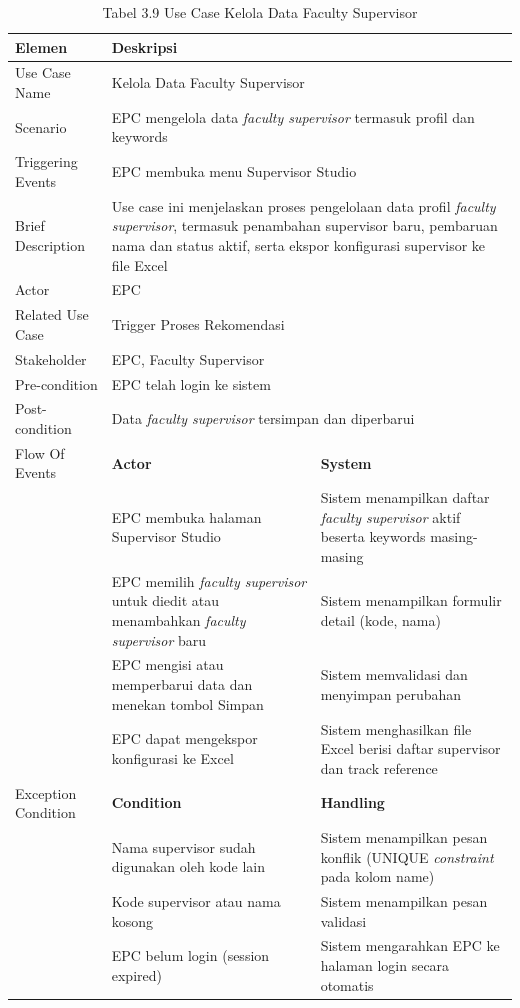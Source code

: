 \begin{longtable}{|p{3.5cm}|p{4.5cm}|p{5cm}|}
\caption{Tabel 3.9 Use Case Kelola Data Faculty Supervisor} \label{table:tab3.9} \\
\hline
\textbf{Elemen} & \multicolumn{2}{p{\ucdeskcol}|}{\textbf{Deskripsi}} \\
\hline
\endfirsthead
\endhead
\hline
\endfoot
Use Case Name & \multicolumn{2}{p{\ucdeskcol}|}{Kelola Data Faculty Supervisor} \\
\hline
Scenario & \multicolumn{2}{p{\ucdeskcol}|}{EPC mengelola data \textit{faculty supervisor} termasuk profil dan keywords} \\
\hline
Triggering Events & \multicolumn{2}{p{\ucdeskcol}|}{EPC membuka menu Supervisor Studio} \\
\hline
Brief Description & \multicolumn{2}{p{\ucdeskcol}|}{Use case ini menjelaskan proses pengelolaan data profil \textit{faculty supervisor}, termasuk penambahan supervisor baru, pembaruan nama dan status aktif, serta ekspor konfigurasi supervisor ke file Excel} \\
\hline
Actor & \multicolumn{2}{p{\ucdeskcol}|}{EPC} \\
\hline
Related Use Case & \multicolumn{2}{p{\ucdeskcol}|}{Trigger Proses Rekomendasi} \\
\hline
Stakeholder & \multicolumn{2}{p{\ucdeskcol}|}{EPC, Faculty Supervisor} \\
\hline
Pre-condition & \multicolumn{2}{p{\ucdeskcol}|}{EPC telah login ke sistem} \\
\hline
Post-condition & \multicolumn{2}{p{\ucdeskcol}|}{Data \textit{faculty supervisor} tersimpan dan diperbarui} \\
\hline
Flow Of Events & \textbf{Actor} & \textbf{System} \\
\hline
 & EPC membuka halaman Supervisor Studio & Sistem menampilkan daftar \textit{faculty supervisor} aktif beserta keywords masing-masing \\
\hline
 & EPC memilih \textit{faculty supervisor} untuk diedit atau menambahkan \textit{faculty supervisor} baru & Sistem menampilkan formulir detail (kode, nama) \\
\hline
 & EPC mengisi atau memperbarui data dan menekan tombol Simpan & Sistem memvalidasi dan menyimpan perubahan \\
\hline
 & EPC dapat mengekspor konfigurasi ke Excel & Sistem menghasilkan file Excel berisi daftar supervisor dan track reference \\
\hline
Exception Condition & \textbf{Condition} & \textbf{Handling} \\
\hline
 & Nama supervisor sudah digunakan oleh kode lain & Sistem menampilkan pesan konflik (UNIQUE \textit{constraint} pada kolom name) \\
\hline
 & Kode supervisor atau nama kosong & Sistem menampilkan pesan validasi \\
\hline
 & EPC belum login (session expired) & Sistem mengarahkan EPC ke halaman login secara otomatis \\
\hline
\end{longtable}

